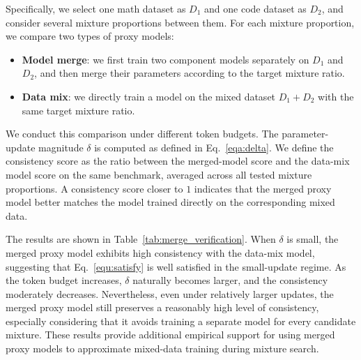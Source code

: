 Specifically, we select one math dataset as $D_1$ and one code dataset as $D_2$, and consider several mixture proportions between them. 
For each mixture proportion, we compare two types of proxy models:
\begin{itemize}
    \item \textbf{Model merge}: we first train two component models separately on $D_1$ and $D_2$, and then merge their parameters according to the target mixture ratio.
    \item \textbf{Data mix}: we directly train a model on the mixed dataset $D_1 + D_2$ with the same target mixture ratio.
\end{itemize}
We conduct this comparison under different token budgets. 
The parameter-update magnitude $\delta$ is computed as defined in Eq.~\ref{eqa:delta}. 
We define the consistency score as the ratio between the merged-model score and the data-mix model score on the same benchmark, averaged across all tested mixture proportions. 
A consistency score closer to $1$ indicates that the merged proxy model better matches the model trained directly on the corresponding mixed data.

The results are shown in Table~\ref{tab:merge_verification}. 
When $\delta$ is small, the merged proxy model exhibits high consistency with the data-mix model, suggesting that Eq.~\ref{equ:satisfy} is well satisfied in the small-update regime. 
As the token budget increases, $\delta$ naturally becomes larger, and the consistency moderately decreases. 
Nevertheless, even under relatively larger updates, the merged proxy model still preserves a reasonably high level of consistency, especially considering that it avoids training a separate model for every candidate mixture. 
These results provide additional empirical support for using merged proxy models to approximate mixed-data training during mixture search.

